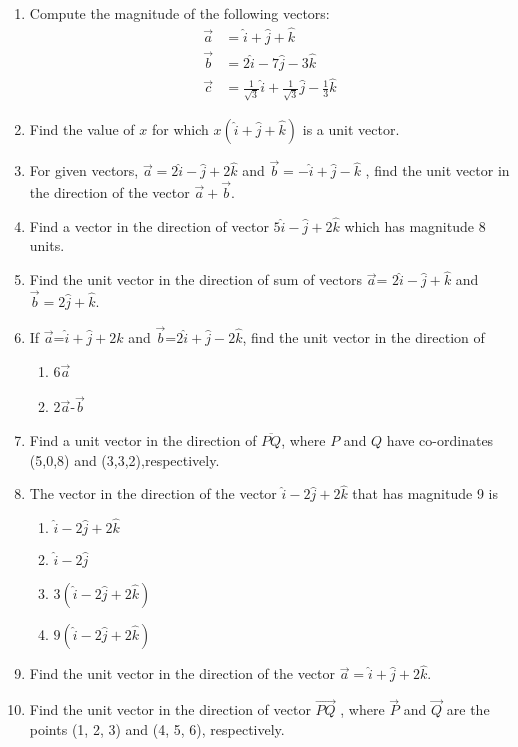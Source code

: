 \begin{enumerate}[label=\thesubsection.\arabic*,ref=\thesubsection.\theenumi]
\item Compute the magnitude of the following vectors:
\begin{align}
	\vec{a}&=\hat{i}+\hat{j}+\hat{k}
	\\
	\vec{b}&=2\hat{i}-7\hat{j}-3\hat{k}
	\\
	\vec{c}&=\frac{1}{\sqrt{3}}\hat{i}+\frac{1}{\sqrt{3}}\hat{j}-\frac{1}{3}\hat{k}
\end{align}
    \solution 
		
\item Find the value of $x$ for which $x(\hat{i}+\hat{j}+\hat{k})$ is a unit vector.\\
	\solution
		
\item For given vectors, $\vec{a}=2\hat{i}-\hat{j}+2\hat{k}$ and $\vec{b}=-\hat{i}+\hat{j}-\hat{k}$ , find the unit vector in the
direction of the vector $\vec{a}+\vec{b}$.
        \label{prob:12/10/2/9}
\\
    \solution 
		
\item Find a vector in the direction of vector $5\hat{i}-\hat{j}+2\hat{k}$ which has magnitude 8 units.
        \label{prob:12/10/2/10const}
   \\ 
    \solution 
		
\item Find the unit vector in the direction of sum of vectors $\vec{a}$= $2\hat{i}-\hat{j}+\hat{k}$  and  $\vec{b}=2\hat{j}+\hat{k}$.
\item If $\vec{a}$=$\hat{i}+\hat{j}+2\hat{k}$  and  $\vec{b}$=$2\hat{i}+\hat{j}-2\hat{k}$, find the unit vector in the direction of
	\begin{enumerate}
		\item 6$\vec{a}$   
		\item 2$\vec{a}$-$\vec{b}$
	\end{enumerate}

\item Find a unit vector in the direction of $\overline{PQ} $, where $P$ and $Q$ have co-ordinates (5,0,8) and (3,3,2),respectively.
\item The vector in the direction of the vector $\hat{i}-2\hat{j}+2\hat{k}$ that has magnitude 9 is
	\begin{enumerate}
\item $\hat{i}-2\hat{j}+2\hat{k}$
\item $\hat{i}-2\hat{j}$
\item $3(\hat{i}-2\hat{j}+2\hat{k})$
\item $9(\hat{i}-2\hat{j}+2\hat{k})$
\end{enumerate}
\item Find the unit vector in the direction of the vector $\vec{a}=\hat{i}+\hat{j}+2\hat{k}$.
\item Find the unit vector in the direction of vector $\overrightarrow{PQ}$ , where $\vec{P}$ and $\vec{Q}$ are the points
(1, 2, 3) and (4, 5, 6), respectively.
\end{enumerate}
